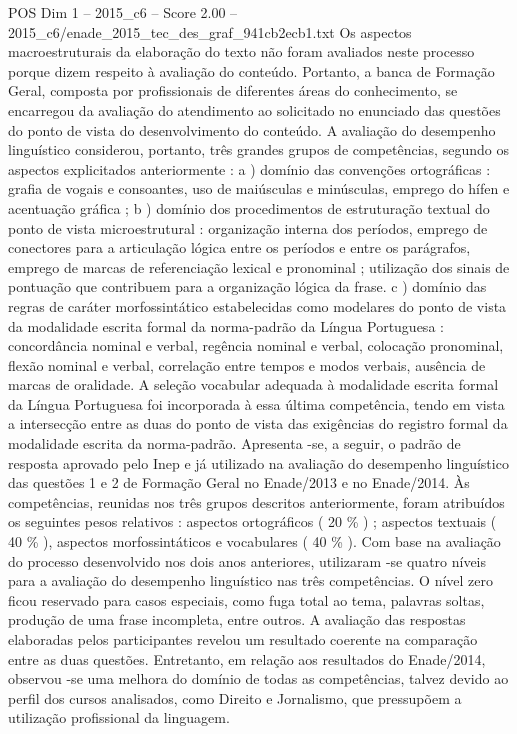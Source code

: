 \begin{textsample}{POS Dim 1 – 2015\_c6 – Score 2.00 – 2015\_c6/enade\_2015\_tec\_des\_graf\_941cb2ecb1.txt}
Os aspectos macroestruturais da elaboração do texto não foram avaliados neste processo porque dizem respeito à avaliação do conteúdo.
Portanto, a banca de Formação Geral, composta por profissionais de diferentes áreas do conhecimento, se encarregou da avaliação do atendimento ao solicitado no enunciado das questões do ponto de vista do desenvolvimento do conteúdo.
A avaliação do desempenho linguístico considerou, portanto, três grandes grupos de competências, segundo os aspectos explicitados anteriormente : a ) domínio das convenções ortográficas : grafia de vogais e consoantes, uso de maiúsculas e minúsculas, emprego do hífen e acentuação gráfica ; b ) domínio dos procedimentos de estruturação textual do ponto de vista microestrutural : organização interna dos períodos, emprego de conectores para a articulação lógica entre os períodos e entre os parágrafos, emprego de marcas de referenciação lexical e pronominal ; utilização dos sinais de pontuação que contribuem para a organização lógica da frase. c ) domínio das regras de caráter morfossintático estabelecidas como modelares do ponto de vista da modalidade escrita formal da norma-padrão da Língua Portuguesa : concordância nominal e verbal, regência nominal e verbal, colocação pronominal, flexão nominal e verbal, correlação entre tempos e modos verbais, ausência de marcas de oralidade.
A seleção vocabular adequada à modalidade escrita formal da Língua Portuguesa foi incorporada à essa última competência, tendo em vista a intersecção entre as duas do ponto de vista das exigências do registro formal da modalidade escrita da norma-padrão.
Apresenta -se, a seguir, o padrão de resposta aprovado pelo Inep e já utilizado na avaliação do desempenho linguístico das questões 1 e 2 de Formação Geral no Enade/2013 e no Enade/2014.
Às competências, reunidas nos três grupos descritos anteriormente, foram atribuídos os seguintes pesos relativos : aspectos ortográficos ( 20 \% ) ; aspectos textuais ( 40 \% ), aspectos morfossintáticos e vocabulares ( 40 \% ).
Com base na avaliação do processo desenvolvido nos dois anos anteriores, utilizaram -se quatro níveis para a avaliação do desempenho linguístico nas três competências.
O nível zero ficou reservado para casos especiais, como fuga total ao tema, palavras soltas, produção de uma frase incompleta, entre outros.
A avaliação das respostas elaboradas pelos participantes revelou um resultado coerente na comparação entre as duas questões.
Entretanto, em relação aos resultados do Enade/2014, observou -se uma melhora do domínio de todas as competências, talvez devido ao perfil dos cursos analisados, como Direito e Jornalismo, que pressupõem a utilização profissional da linguagem.

\end{textsample}
